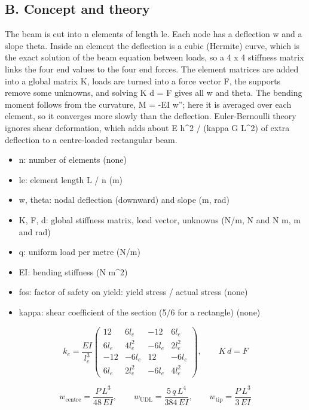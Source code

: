 \documentclass[11pt,a4paper]{article}
\begin{document}
\subsection*{B. Concept and theory}
The beam is cut into n elements of length le. Each node has a deflection w and a slope theta. Inside an element the deflection is a cubic (Hermite) curve, which is the exact solution of the beam equation between loads, so a 4 x 4 stiffness matrix links the four end values to the four end forces. The element matrices are added into a global matrix K, loads are turned into a force vector F, the supports remove some unknowns, and solving K d = F gives all w and theta. The bending moment follows from the curvature, M = -EI w''; here it is averaged over each element, so it converges more slowly than the deflection. Euler-Bernoulli theory ignores shear deformation, which adds about E h\textasciicircum{}2 / (kappa G L\textasciicircum{}2) of extra deflection to a centre-loaded rectangular beam.

\begin{itemize}[nosep]
\item n: number of elements (none)
\item le: element length L / n (m)
\item w, theta: nodal deflection (downward) and slope (m, rad)
\item K, F, d: global stiffness matrix, load vector, unknowns (N/m, N and N m, m and rad)
\item q: uniform load per metre (N/m)
\item EI: bending stiffness (N m\textasciicircum{}2)
\item fos: factor of safety on yield: yield stress / actual stress (none)
\item kappa: shear coefficient of the section (5/6 for a rectangle) (none)
\end{itemize}

\begin{equation*}
k_e=\frac{EI}{l_e^{3}}\begin{pmatrix}12&6l_e&-12&6l_e\\6l_e&4l_e^{2}&-6l_e&2l_e^{2}\\-12&-6l_e&12&-6l_e\\6l_e&2l_e^{2}&-6l_e&4l_e^{2}\end{pmatrix},\qquad K\,d=F
\end{equation*}

\begin{equation*}
w_{\mathrm{centre}}=\frac{P\,L^{3}}{48\,EI},\qquad w_{\mathrm{UDL}}=\frac{5\,q\,L^{4}}{384\,EI},\qquad w_{\mathrm{tip}}=\frac{P\,L^{3}}{3\,EI}
\end{equation*}
\end{document}
